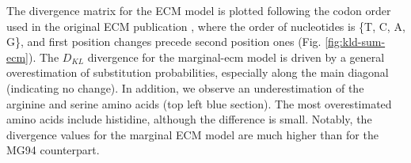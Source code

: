 The divergence matrix for the ECM model is plotted following the codon order used in the original ECM publication \citep{kosiol_ECM_2007}, where the order of nucleotides is \{T, C, A, G\}, and first position changes precede second position ones (Fig. \ref{fig:kld-sum-ecm}).
The $D_{KL}$ divergence for the marginal-ecm model is driven by a general overestimation of substitution probabilities, especially along the main diagonal (indicating no change). In addition, we observe an underestimation of the arginine and serine amino acids (top left blue section). The most overestimated amino acids include histidine, although the difference is small. Notably, the divergence values for the marginal ECM model are much higher than for the MG94 counterpart.


